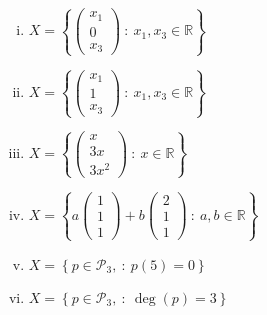 	\begin{enumerate}[(i)]
		\item $\displaystyle X = \left\{  \begin{pmatrix}x_1\\0\\x_3\end{pmatrix}\ :\ x_1,x_3\in\mathbb{R}  \right\}$
		
		\item $\displaystyle X = \left\{  \begin{pmatrix}x_1\\1\\x_3\end{pmatrix}\ :\ x_1,x_3\in\mathbb{R}  \right\}$
		
		\item $\displaystyle X = \left\{  \begin{pmatrix}x\\3x\\3x^2\end{pmatrix}\ :\ x\in\mathbb{R}  \right\}$
		
		\item $\displaystyle 
		X = \left\{  a\begin{pmatrix}1\\1\\1\end{pmatrix} + b\begin{pmatrix}2\\1\\1\end{pmatrix}\ :\ a,b\in\mathbb{R}   \right\}$
		
		\item $\displaystyle X = \left\{  p\in \mathcal{P}_3,\ :\ p(5)=0  \right \}$
		
		\item $\displaystyle X = \left\{  p\in \mathcal{P}_3,\ :\ \deg(p)=3  \right \}$
		
	\end{enumerate}
\renewcommand\qedsymbol{}
\renewcommand*{\proofname}{Solution}
